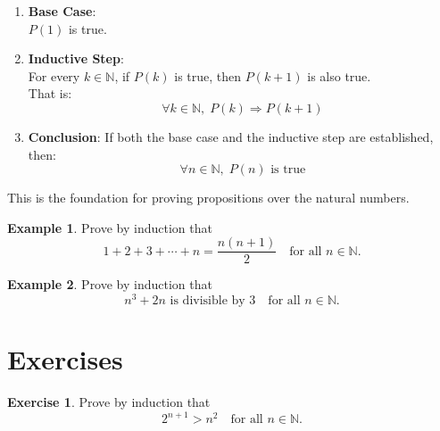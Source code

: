 \documentclass[
]{book}
\theoremstyle{definition}
\theoremstyle{definition}
\newtheorem{example}{Example}[chapter]
\theoremstyle{definition}
\newtheorem{exercise}{Exercise}[chapter]
\theoremstyle{definition}
\theoremstyle{remark}
\begin{document}
\begin{enumerate}
\def\labelenumi{\arabic{enumi}.}
\item
  \textbf{Base Case}:\\
  \(P(1)\) is true.
\item
  \textbf{Inductive Step}:\\
  For every \(k \in \mathbb{N}\), if \(P(k)\) is true, then \(P(k+1)\) is also true.\\
  That is:
  \[   \forall k \in \mathbb{N},\; P(k) \Rightarrow P(k+1)\]
\item
  \textbf{Conclusion}: If both the base case and the inductive step are established, then:
  \[
  \forall n \in \mathbb{N},\; P(n) \text{ is true}
  \]
\end{enumerate}

This is the foundation for proving propositions over the natural numbers.

\begin{example}
\protect\hypertarget{exm:unnamed-chunk-89}{}\label{exm:unnamed-chunk-89}Prove by induction that\\
\[
1 + 2 + 3 + \cdots + n = \frac{n(n+1)}{2}
\quad \text{for all } n \in \mathbb{N}.
\]
\end{example}

\begin{example}
\protect\hypertarget{exm:unnamed-chunk-90}{}\label{exm:unnamed-chunk-90}Prove by induction that\\
\[
n^3 + 2n \text{ is divisible by } 3
\quad \text{for all } n \in \mathbb{N}.
\]
\end{example}

\section{Exercises}\label{exercises}

\begin{exercise}
\protect\hypertarget{exr:unnamed-chunk-91}{}\label{exr:unnamed-chunk-91}Prove by induction that\\
\[
2^{n+1} > n^2
\quad \text{for all } n \in \mathbb{N}.
\]
\end{exercise}
\end{document}
